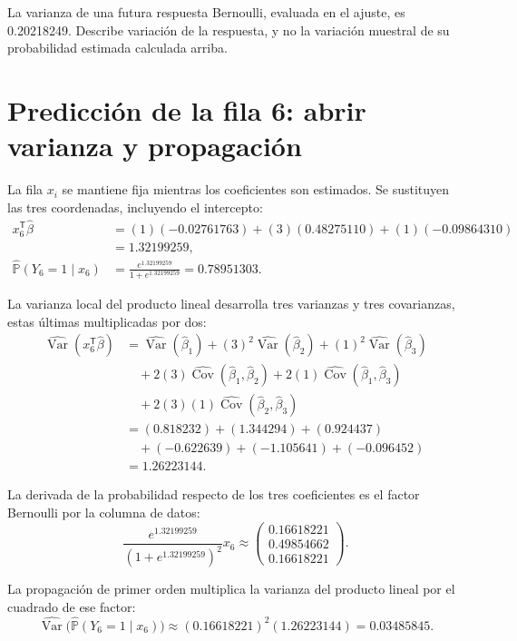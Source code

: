 \documentclass[11pt,a4paper]{article}
\newcommand{\Prob}{\mathbb P}
\newcommand{\T}{^{\mathsf T}}
\DeclareMathOperator{\Var}{Var}
\DeclareMathOperator{\Cov}{Cov}
\begin{document}
La varianza de una futura respuesta Bernoulli,
evaluada en el ajuste, es 0.20218249.
Describe variación de la respuesta, y no la variación
muestral de su probabilidad estimada calculada arriba.
\endgroup

\clearpage
\section{Predicción de la fila 6: abrir varianza y propagación}\label{logit115}
\begingroup\small
\setlength{\abovedisplayskip}{4pt}\setlength{\belowdisplayskip}{4pt}
La fila \(x_i\) se mantiene fija mientras los coeficientes
son estimados. Se sustituyen las tres coordenadas,
incluyendo el intercepto:
\[
\begin{aligned}
x_{6}\T\widehat\beta&=(1)(-0.02761763)+(3)(0.48275110)+(1)(-0.09864310)\\&=1.32199259,\\\widehat{\Prob}(Y_{6}=1\mid x_{6})&=\frac{e^{1.32199259}}{1+e^{1.32199259}}=0.78951303.\end{aligned}
\]

La varianza local del producto lineal desarrolla tres varianzas
y tres covarianzas, estas últimas multiplicadas por dos:
\[
\begin{aligned}
\widehat{\Var}(x_{6}\T\widehat\beta)&=\widehat{\Var}(\widehat\beta_1)+(3)^2\widehat{\Var}(\widehat\beta_2)+(1)^2\widehat{\Var}(\widehat\beta_3)\\&\quad+2(3)\widehat{\Cov}(\widehat\beta_1,\widehat\beta_2)+2(1)\widehat{\Cov}(\widehat\beta_1,\widehat\beta_3)\\&\quad+2(3)(1)\widehat{\Cov}(\widehat\beta_2,\widehat\beta_3)\\&=(0.818232)+(1.344294)+(0.924437)\\&\quad+(-0.622639)+(-1.105641)+(-0.096452)\\&=1.26223144.\end{aligned}
\]

La derivada de la probabilidad respecto de los tres coeficientes
es el factor Bernoulli por la columna de datos:
\[
\frac{e^{1.32199259}}{(1+e^{1.32199259})^2}x_{6}\approx\begin{pmatrix}0.16618221\\0.49854662\\0.16618221\end{pmatrix}.
\]

La propagación de primer orden multiplica la varianza del
producto lineal por el cuadrado de ese factor:
\[
\widehat{\Var}\bigl(\widehat{\Prob}(Y_{6}=1\mid x_{6})\bigr)\approx(0.16618221)^2(1.26223144)=0.03485845.
\]
\end{document}
